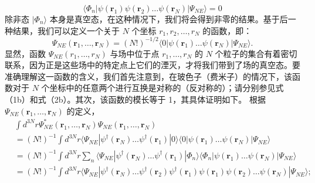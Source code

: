 \begin{equation}\tag{11.1.16}\label{eq:11.1.16}
\langle \Phi _ { n } | \psi ( \pmb { r } _ { 1 } ) \psi ( \pmb { r } _ { 2 } ) \ldots \psi ( \pmb { r } _ { N } ) | \Psi _ { N E } \rangle = 0
\end{equation}
除非态 \(|\Phi_{n}\rangle\) 本身是真空态，在这种情况下，我们将会得到非零的结果。基于后一种结果，我们可以定义一个关于 \(N\) 个坐标 \(r_{1}, r_{2}, \ldots, r_{N}\) 的函数，即：
\begin{equation}\tag{11.1.17}\label{eq:11.1.17}
\Psi _ { N E } ( \pmb { r } _ { 1 } , \ldots , \pmb { r } _ { N } ) = ( N ! ) ^{- 1 / 2} \langle 0 | \psi ( \pmb { r } _ { 1 } ) \ldots \psi ( \pmb { r } _ { N } ) | \Psi _ { N E } \rangle .
\end{equation}
显然，函数 \(\Psi_{NE}(r_{1},\ldots,r_{N})\) 与场中位于点 \(r_{1},\ldots,r_{N}\) 的 \(N\) 个粒子的集合有着密切联系，因为正是这些场中的特定点上它们的湮灭，才将我们带到了场的真空态。要准确理解这一函数的含义，我们首先注意到，在玻色子（费米子）的情况下，该函数对于 \(N\) 个坐标中的任意两个进行互换是对称的（反对称的）；请分别参见式（1b）和式（2b）。其次，该函数的模长等于 1，其具体证明如下。
根据 \(\Psi_{NE}(\boldsymbol{r}_1,\ldots,\boldsymbol{r}_N)\) 的定义，
\begin{equation}\tag{11.1.18}\label{eq:11.1.18}
\begin{array}{rl} & { \int d ^{3 N} r \Psi _ { N E } ^{*} ( \pmb { r } _ { 1 } , \ldots , \pmb { r } _ { N } ) \Psi _ { N E } ( \pmb { r } _ { 1 } , \ldots , \pmb { r } _ { N } ) } \\& {  = ( N ! ) ^{- 1} \int d ^{3 N} r \langle \Psi _ { N E } | \psi ^{\dagger} ( \pmb { r } _ { N } ) \ldots \psi ^{\dagger} ( \pmb { r } _ { 1 } ) | 0 \rangle \langle 0 | \psi ( \pmb { r } _ { 1 } ) \ldots \psi ( \pmb { r } _ { N } ) | \Psi _ { N E } \rangle } \\& {  = ( N ! ) ^{- 1} \int d ^{3 N} r \sum _ { n } \langle \Psi _ { N E } | \psi ^{\dagger} ( \pmb { r } _ { N } ) \ldots \psi ^{\dagger} ( \pmb { r } _ { 1 } ) | \Phi _ { n } \rangle \langle \Phi _ { n } | \psi ( \pmb { r } _ { 1 } ) \ldots \psi ( \pmb { r } _ { N } ) | \Psi _ { N E } \rangle } \\& {  = ( N ! ) ^{- 1} \int d ^{3 N} r \langle \Psi _ { N E } | \psi ^{\dagger} ( \pmb { r } _ { N } ) \ldots \psi ^{\dagger} ( \pmb { r } _ { 2 } ) \psi ^{\dagger} ( \pmb { r } _ { 1 } ) \psi ( \pmb { r } _ { 1 } ) \psi ( \pmb { r } _ { 2 } ) \ldots \psi ( \pmb { r } _ { N } ) | \Psi _ { N E } \rangle ; } \end{array}
\end{equation}
